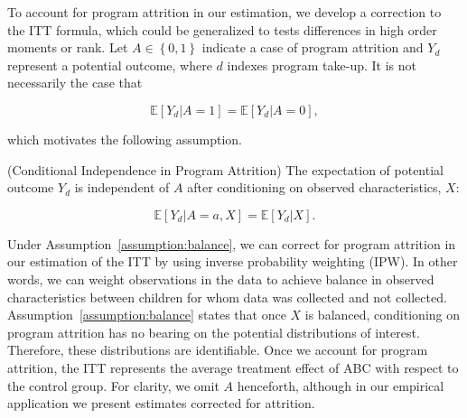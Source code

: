 \noindent To account for program attrition in our estimation, we develop a correction to the ITT formula, which could be generalized to tests differences in high order moments or rank. Let $A \in \left \{ 0,1 \right \}$ indicate a case of program attrition and $Y_{d} $ represent a potential outcome, where $d$ indexes program take-up. It is not necessarily the case that 

\begin{equation}
\mathbb{E} \left[ Y_{d} |  A = 1 \right]  = \mathbb{E} \left[ Y_{d} | A = 0  \right],
\end{equation}

\noindent which motivates the following assumption. 

\begin{assumption} \normalfont \label{assumption:balance} (Conditional Independence in Program Attrition) The expectation of potential outcome $Y_{d}$ is independent of $A$ after conditioning on observed characteristics, $X$: 

\begin{equation}
\mathbb{E} \left[ Y_{d} | A = a, X \right] = \mathbb{E} \left[ Y_{d} | X \right].
\end{equation}

\end{assumption}

\noindent Under Assumption~\ref{assumption:balance}, we can correct for program attrition in our estimation of the ITT by using inverse probability weighting (IPW). In other words, we can weight observations in the data to achieve balance in observed characteristics between children for whom data was collected and not collected. Assumption~\ref{assumption:balance} states that once $X$ is balanced, conditioning on program attrition has no bearing on the potential distributions of interest. Therefore, these distributions are identifiable. Once we account for program attrition, the ITT represents the average treatment effect of ABC with respect to the control group. For clarity, we omit $A$ henceforth, although in our empirical application we present estimates corrected for attrition.\\

